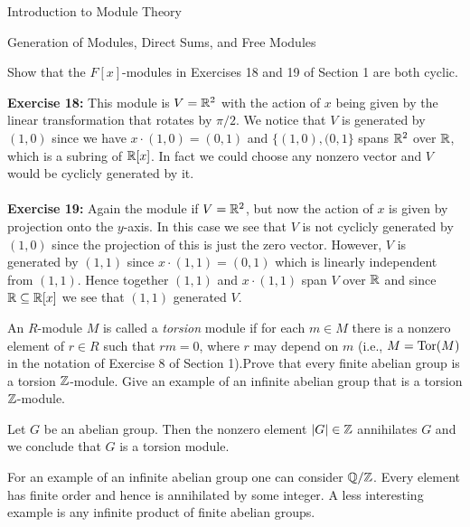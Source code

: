 \begin{chapter}{Introduction to Module Theory}
\begin{section}{Generation of Modules, Direct Sums, and Free Modules}
\begin{problem}\label{ex:10.3.3}
Show that the $F[x]$-modules in Exercises 18 and 19 of Section 1 are both cyclic. 
\end{problem}
\begin{solution}
\textbf{Exercise 18:} This module is $V = \mathbb{R}^2$ with the action of $x$ being given by the linear transformation that rotates by $\pi/2$. We notice that $V$ is generated by $(1,0)$ since we have $x\cdot(1,0) = (0,1)$ and $\{(1,0),(0,1\}$ spans $\mathbb{R}^2$ over $\mathbb{R}$, which is a subring of $\mathbb{R}[x]$. In fact we could choose any nonzero vector and $V$ would be cyclicly generated by it. \\\\
\textbf{Exercise 19:} Again the module if $V = \mathbb{R}^2$, but now the action of $x$ is given by projection onto the $y$-axis. In this case we see that $V$ is not cyclicly generated by $(1,0)$ since the projection of this is just the zero vector. However, $V$ is generated by $(1,1)$ since $x\cdot (1,1) = (0,1)$ which is linearly independent from $(1,1)$. Hence together $(1,1)$ and $x\cdot (1,1)$ span $V$ over $\mathbb{R}$ and since $\mathbb{R}\subseteq \mathbb{R}[x]$ we see that $(1,1)$ generated $V$. 

\end{solution}\oneperpage



\begin{problem}\label{ex:10.3.4}
An $R$-module $M$ is called a \emph{torsion} module if for each $m\in M$ there is a nonzero element of $r\in R$ such that $rm=0$, where $r$ may depend on $m$ (i.e., $M=\operatorname{Tor}(M)$ in the notation of Exercise 8 of Section 1).Prove that every finite abelian group is a torsion $\mathbb{Z}$-module. Give an example of an infinite abelian group that is a torsion $\mathbb{Z}$-module.
\end{problem}
\begin{solution}
Let $G$ be an abelian group. Then the nonzero element $|G|\in \mathbb{Z}$ annihilates $G$ and we conclude that $G$ is a torsion module. 

For an example of an infinite abelian group one can consider $\mathbb{Q}/\mathbb{Z}$. Every element has finite order and hence is annihilated by some integer. A less interesting example is any infinite product of finite abelian groups.
\end{solution}\oneperpage




\end{section}
\end{chapter}
